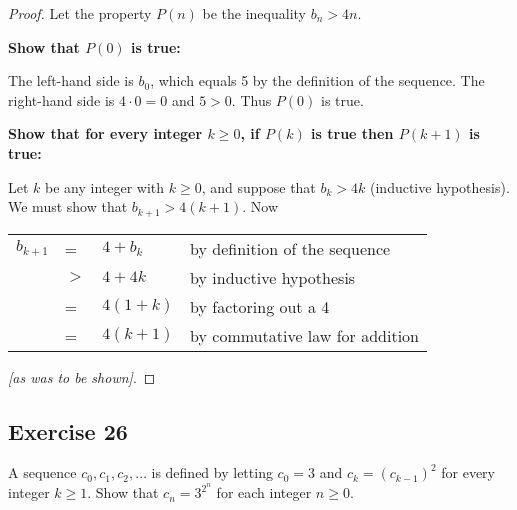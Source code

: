 \documentclass[14pt]{extarticle}
\newcommand{\dps}{\displaystyle}
\newcommand{\cy}{\color{cyan}}
\begin{document}
\begin{proof}
    Let the property $P(n)$ be the inequality $b_n > 4n$.

        {\bf Show that $P(0)$ is true:}

    The left-hand side is $b_0$, which equals 5 by the definition of the sequence. The right-hand side is $4 \cdot 0 = 0$ and $5 > 0$. Thus $P(0)$ is true.

        {\bf Show that for every integer $k \geq 0$, if $P(k)$ is true then $P(k + 1)$ is true:}

    Let $k$ be any integer with $k \geq 0$, and suppose that $b_k > 4k$ ({\cy inductive hypothesis}). We must show that $b_{k + 1} > 4(k+1)$. Now

    \begin{center}
        \begin{tabular}{rlll}
            $b_{k+1}$ & =   & $4 + b_k$  & {\cy by definition of the sequence}   \\
                      & $>$ & $4 + 4k$   & {\cy by inductive hypothesis}         \\
                      & =   & $4(1 + k)$ & {\cy by factoring out a 4}            \\
                      & =   & $4(k + 1)$ & {\cy by commutative law for addition}
        \end{tabular}
    \end{center}

    {\it [as was to be shown]}.
\end{proof}

\subsection{Exercise 26}
A sequence $c_0, c_1, c_2, \ldots$ is defined by letting
$c_0 = 3$ and $c_k = (c_{k-1})^2$ for every integer $k \geq 1$. Show that $\dps c_n = 3^{2^n}$ for each integer $n \geq 0$.
\end{document}
